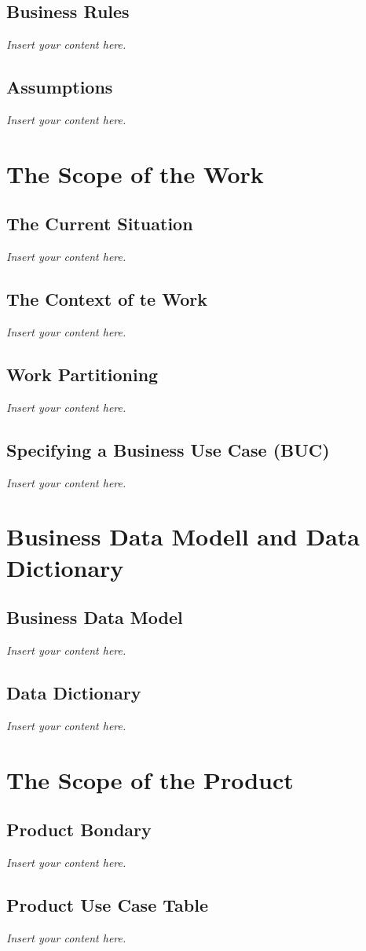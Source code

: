 \documentclass[a4paper, 12pt,twoside]{article}
\newcommand{\lips}{\textit{Insert your content here.}}
\begin{document}
\subsection{Business Rules}
\lips
\subsection{Assumptions}
\lips

\section{The Scope of the Work}
\subsection{The Current Situation}
\lips
\subsection{The Context of te Work}
\lips
\subsection{Work Partitioning}
\lips
\subsection{Specifying a Business Use Case (BUC)}
\lips

\section{Business Data Modell and Data Dictionary}
\subsection{Business Data Model}
\lips
\subsection{Data Dictionary}
\lips

\section{The Scope of the Product}
\subsection{Product Bondary}
\lips
\subsection{Product Use Case Table}
\lips
\end{document}
